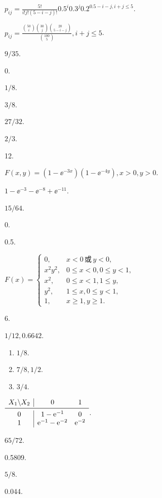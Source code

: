 \begin{answer}
  \item $p_{ij}=\frac{5!}{i!j!(5-i-j)!}0.5^i0.3^j0.2^{0.5-i-j,i+j\le5}$.
  \item $p_{ij}=\frac{\binom{50}i\binom{30}j\binom{20}{5-i-j}}
  {\binom{100}5},i+j\le5$.
  \item $9/35$.
  \item 0.
  \item \begin{enumerate*}
    \item $1/8$.
    \item $3/8$.
    \item $27/32$.
    \item $2/3$.
  \end{enumerate*}
  \item \begin{enumerate*}
    \item 12.
    \item $F(x,y)=(1-\ee^{-3x})(1-\ee^{-4y}),x>0,y>0$.
    \item $1-\ee^{-3}-\ee^{-8}+\ee^{-11}$.
  \end{enumerate*}
  \item \begin{enumerate*}
    \item $15/64$.
    \item 0.
    \item 0.5.
    \item $F(x)=\begin{cases}
      0, & x<0\,\text{或}\, y<0, \\
      x^2y^2, & 0\le x<0, 0\le y<1,\\
      x^2, & 0\le x<1,1\le y,\\
      y^2, & 1\le x,0\le y<1, \\
      1, & x\ge1,y\ge1.
    \end{cases}$
  \end{enumerate*}
  \item \begin{enumerate*}
    \item 6.
    \item $1/12,0.6642$.
  \end{enumerate*}
  \item \begin{enumerate}
    \item $1/8$.
    \item $7/8,1/2$.
    \item $3/4$.
  \end{enumerate}
  \item $\begin{array}{c|cc}
    X_1\backslash X_2 & 0 & 1 \\
    \midrule
    0 & 1-\ee^{-1} & 0 \\
    1 & \ee^{-1}-\ee^{-2} & \ee^{-2}
  \end{array}$.
  \item $65/72$.
  \item 0.5809.
  \item $5/8$.
  \item 0.044.
\end{answer}

